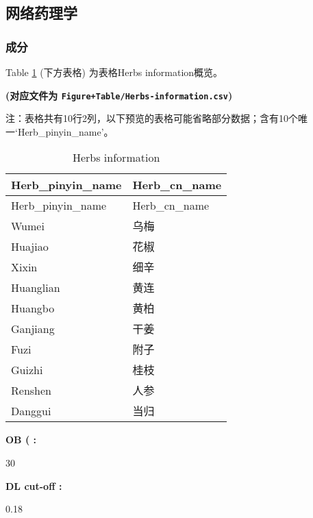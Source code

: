 \documentclass[
]{article}
\begin{document}
\hypertarget{ux7f51ux7edcux836fux7406ux5b66}{%
\subsection{网络药理学}\label{ux7f51ux7edcux836fux7406ux5b66}}

\hypertarget{ux6210ux5206}{%
\subsubsection{成分}\label{ux6210ux5206}}

Table \ref{tab:Herbs-information} (下方表格) 为表格Herbs information概览。

\textbf{(对应文件为 \texttt{Figure+Table/Herbs-information.csv})}

\begin{center}\begin{tcolorbox}[colback=gray!10, colframe=gray!50, width=0.9\linewidth, arc=1mm, boxrule=0.5pt]注：表格共有10行2列，以下预览的表格可能省略部分数据；含有10个唯一`Herb\_pinyin\_name'。
\end{tcolorbox}
\end{center}

\begin{longtable}[]{@{}ll@{}}
\caption{\label{tab:Herbs-information}Herbs information}\tabularnewline
\toprule
Herb\_pinyin\_name & Herb\_cn\_name\tabularnewline
\midrule
\endfirsthead
\toprule
Herb\_pinyin\_name & Herb\_cn\_name\tabularnewline
\midrule
\endhead
Wumei & 乌梅\tabularnewline
Huajiao & 花椒\tabularnewline
Xixin & 细辛\tabularnewline
Huanglian & 黄连\tabularnewline
Huangbo & 黄柏\tabularnewline
Ganjiang & 干姜\tabularnewline
Fuzi & 附子\tabularnewline
Guizhi & 桂枝\tabularnewline
Renshen & 人参\tabularnewline
Danggui & 当归\tabularnewline
\bottomrule
\end{longtable}

\begin{center}\begin{tcolorbox}[colback=gray!10, colframe=gray!50, width=0.9\linewidth, arc=1mm, boxrule=0.5pt]
\textbf{
OB (%
:}

\vspace{0.5em}

    30%

\vspace{2em}


\textbf{
DL cut-off
:}

\vspace{0.5em}

    0.18

\vspace{2em}
\end{tcolorbox}
\end{center}
\end{document}
